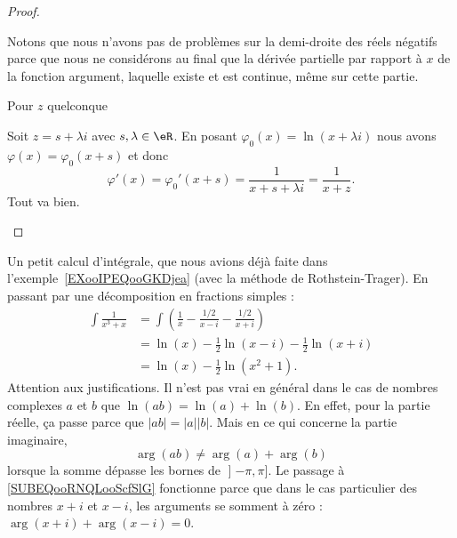 \begin{proof}
\begin{subproof}
    Notons que nous n'avons pas de problèmes sur la demi-droite des réels négatifs parce que nous ne considérons au final que la dérivée partielle par rapport à \( x\) de la fonction argument, laquelle existe et est continue, même sur cette partie.

        \item[Pour \( z\) quelconque]

            Soit \( z=s+\lambda i\) avec \( s,\lambda\in \eR\). En posant \( \varphi_0(x)=\ln(x+\lambda i)\) nous avons \( \varphi(x)=\varphi_0(x+s)\) et donc
            \begin{equation}
                \varphi'(x)=\varphi_0'(x+s)=\frac{ 1 }{ x+s+\lambda i }=\frac{1}{ x+z }.
            \end{equation}
            Tout va bien.

    \end{subproof}
\end{proof}

\begin{example}     \label{EXooAKEDooZgjocX}
    Un petit calcul d'intégrale, que nous avions déjà faite dans l'exemple~\ref{EXooIPEQooGKDjea} (avec la méthode de Rothstein-Trager). En passant par une décomposition en fractions simples :
    \begin{subequations}
        \begin{align}
            \int\frac{1}{ x^3+x }&=\int\left( \frac{1}{ x }-\frac{ 1/2 }{ x-i }-\frac{ 1/2 }{ x+i } \right)\\
            &=\ln(x)-\frac{ 1 }{2}\ln(x-i)-\frac{ 1 }{2}\ln(x+i)\\
            &=\ln(x)-\frac{ 1 }{2}\ln(x^2+1).       \label{SUBEQooRNQLooScfSlG}
        \end{align}
    \end{subequations}
    Attention aux justifications. Il n'est pas vrai en général dans le cas de nombres complexes \( a\) et \( b\) que \( \ln(ab)=\ln(a)+\ln(b)\). En effet, pour la partie réelle, ça passe parce que \( | ab |=| a | |b |\). Mais en ce qui concerne la partie imaginaire,
    \begin{equation}
        \arg(ab)\neq \arg(a)+\arg(b)
    \end{equation}
lorsque la somme dépasse les bornes de \( \mathopen] -\pi , \pi \mathclose]\). Le passage à \eqref{SUBEQooRNQLooScfSlG} fonctionne parce que dans le cas particulier des nombres \( x+i\) et \( x-i\), les arguments se somment à zéro : \( \arg(x+i)+\arg(x-i)=0\).
\end{example}


